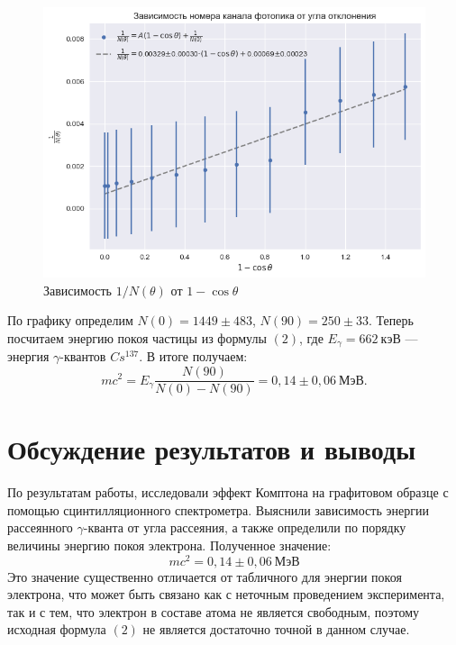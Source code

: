 \documentclass[a4paper, 12pt]{article}
\begin{document}
\begin{figure}[h]
\begin{center}
\includegraphics[width = \textwidth]{plot.png}
\caption{Зависимость $1/N(\theta)$ от $1 - \cos{\theta}$}
\label{fig:plot}
\end{center}
\end{figure}

По графику определим $N(0) = 1449\pm483$, $N(90) = 250\pm33$. Теперь посчитаем энергию покоя частицы из формулы $(2)$, где $E_{\gamma} = 662~кэВ$ --- энергия $\gamma$-квантов $Cs^{137}$. В итоге получаем:
\begin{equation}
mc^2 = E_{\gamma} \frac{N(90)}{N(0) - N(90)} = 0,14\pm0,06~МэВ.
\end{equation}

\newpage

\section{Обсуждение результатов и выводы}

По результатам работы, исследовали эффект Комптона на графитовом образце с помощью сцинтилляционного спектрометра. Выяснили зависимость  энергии рассеянного $\gamma$-кванта от угла рассеяния, а также определили по порядку величины энергию покоя электрона. Полученное значение:
\begin{equation}
\boxed{mc^2 = 0,14\pm0,06~МэВ}
\end{equation}
Это значение существенно отличается от табличного для энергии покоя электрона, что может быть связано как с неточным проведением эксперимента, так и с тем, что электрон  в составе атома не является свободным, поэтому исходная формула $(2)$ не является достаточно точной в данном случае.
\end{document}
